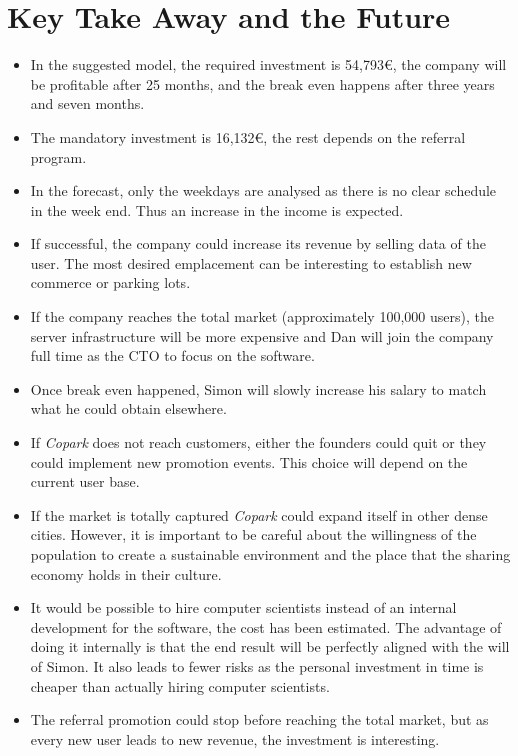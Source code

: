 \documentclass[12pt,a4paper,oneside]{book}
\newcommand{\bp}{\textit{Copark}}
\begin{document}
\section{Key Take Away and the Future}

\begin{itemize}
\item In the suggested model, the required investment is 54,793\euro{}, the company will be profitable after 25 months, and the break even happens after three years and seven months.
\item The mandatory investment is 16,132\euro{}, the rest depends on the referral program.
\item In the forecast, only the weekdays are analysed as there is no clear schedule in the week end. Thus an increase in the income is expected.
\item If successful, the company could increase its revenue by selling data of the user. The most desired emplacement can be interesting to establish new commerce or parking lots.
\item If the company reaches the total market (approximately 100,000 users), the server infrastructure will be more expensive and Dan will join the company full time as the CTO to focus on the software.
\item Once break even happened, Simon will slowly increase his salary to match what he could obtain elsewhere. 
\item If \bp{} does not reach customers, either the founders could quit or they could implement new promotion events. This choice will depend on the current user base.
\item If the market is totally captured \bp{} could expand itself in other dense cities. However, it is important to be careful about the willingness of the population to create a sustainable environment and the place that the sharing economy holds in their culture.
\item It would be possible to hire computer scientists instead of an internal development for the software, the cost has been estimated. The advantage of doing it internally is that the end result will be perfectly aligned with the will of Simon. It also leads to fewer risks as the personal investment in time is cheaper than actually hiring computer scientists.
\item The referral promotion could stop before reaching the total market, but as every new user leads to new revenue, the investment is interesting.
\end{itemize}
\end{document}
